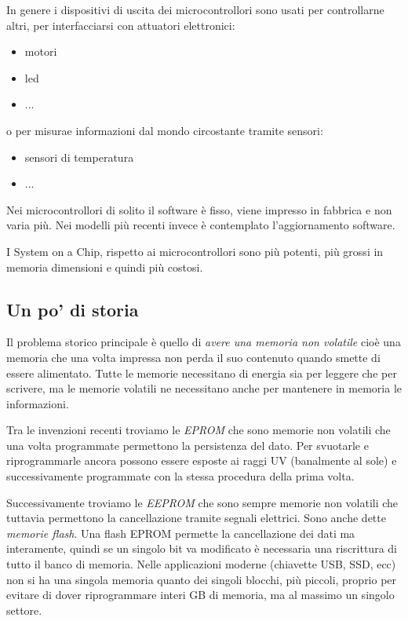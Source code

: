 In genere i dispositivi di uscita dei microcontrollori sono usati per controllarne altri, per interfacciarsi con attuatori elettronici:
\begin{itemize}
    \item motori
    \item led
    \item ...
\end{itemize}
o per misurae informazioni dal mondo circostante tramite sensori:
\begin{itemize}
    \item sensori di temperatura
    \item ...
\end{itemize}

Nei microcontrollori di solito il software è fisso, viene impresso in fabbrica e non varia più. Nei modelli più recenti invece è contemplato l'aggiornamento software.

I System on a Chip, rispetto ai microcontrollori sono più potenti, più grossi in memoria  dimensioni e quindi più costosi.

\subsection{Un po' di storia}
Il problema storico principale è quello di \emph{avere una memoria non volatile} cioè una memoria che una volta impressa non perda il suo contenuto quando smette di essere alimentato. Tutte le memorie necessitano di energia sia per leggere che per scrivere, ma le memorie volatili ne necessitano anche per mantenere in memoria le informazioni.

Tra le invenzioni recenti troviamo le \emph{EPROM} che sono memorie non volatili che una volta programmate permettono la persistenza del dato. Per svuotarle e riprogrammarle ancora possono essere esposte ai raggi UV (banalmente al sole) e successivamente programmate con la stessa procedura della prima volta.

Successivamente troviamo le \emph{EEPROM} che sono sempre memorie non volatili che tuttavia permettono la cancellazione tramite segnali elettrici. Sono anche dette \emph{memorie flash}. Una flash EPROM permette la cancellazione dei dati ma interamente, quindi se un singolo bit va modificato è necessaria una riscrittura di tutto il banco di memoria. Nelle applicazioni moderne (chiavette USB, SSD, ecc) non si ha una singola memoria quanto dei singoli blocchi, più piccoli, proprio per evitare di dover riprogrammare interi GB di memoria, ma al massimo un singolo settore.

